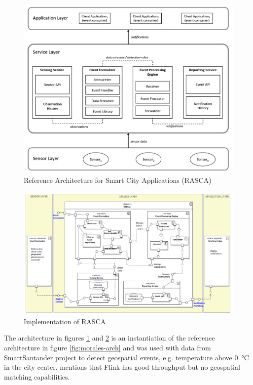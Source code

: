\documentclass[parskip=half]{scrartcl}
\begin{document}
\begin{figure}
	\centering
	\includegraphics[width=\textwidth]{Garcia_2019a}
	\caption{Reference Architecture for Smart City Applications (RASCA)~\cite[p.~12]{GarciaAlvarez.2019}}
	\label{fig:rasca}
\end{figure}

\begin{figure}
	\centering
	\includegraphics[width=\textwidth]{Garcia_2019b}
	\caption{Implementation of RASCA~\cite[p.~13]{GarciaAlvarez.2019}}
	\label{fig:rasca-impl}
\end{figure}

The architecture in figures \ref{fig:rasca} and \ref{fig:rasca-impl} is an instantiation of the reference architecture in figure \ref{fig:morales-arch} and was used with data from SmartSantander project to detect geospatial events, e.g. temperature above \SI{0}{\celsius} in the city center. \cite{GarciaAlvarez.2019} mentions that Flink has good throughput but no geospatial matching capabilities. 
\end{document}
